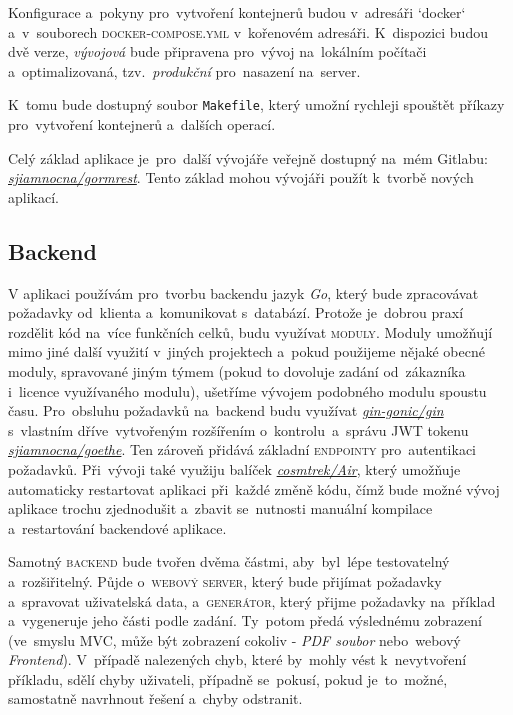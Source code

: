 \documentclass[14pt,a4paper]{article}
\begin{document}
        Konfigurace a~pokyny pro~vytvoření kontejnerů budou v~adresáři `docker` a~v~souborech \textsc{docker-compose.yml} v~kořenovém adresáři. K~dispozici budou dvě verze, \emph{vývojová} bude připravena pro~vývoj na~lokálním počítači a~optimalizovaná, tzv.~\emph{produkční} pro~nasazení na~server.

        K~tomu bude dostupný soubor \texttt{Makefile}, který umožní rychleji spouštět příkazy pro~vytvoření kontejnerů a~dalších operací.

        Celý základ aplikace je~pro~další vývojáře veřejně dostupný na~mém Gitlabu: \href{https://gitlab.com/sjiamnocna/gormrest}{\emph{sjiamnocna/gormrest}}. Tento základ mohou vývojáři použít k~tvorbě nových aplikací.
        
        \subsection{Backend}
            V aplikaci používám pro~tvorbu backendu jazyk \emph{Go}, který bude zpracovávat požadavky od~klienta a~komunikovat s~databází.
            Protože je~dobrou praxí rozdělit kód na~více funkčních celků, budu využívat \textsc{moduly}. Moduly umožňují mimo jiné další využití v~jiných projektech a~pokud použijeme nějaké obecné moduly, spravované jiným týmem (pokud to dovoluje zadání od~zákazníka i~licence využívaného modulu), ušetříme vývojem podobného modulu spoustu času. \cite{Zimmerman2023:howtowritebetter}
            Pro~obsluhu požadavků na~backend budu využívat \href{https://github.com/gin-gonic/gin}{\emph{gin-gonic/gin}} s~vlastním dříve~vytvořeným rozšířením o~kontrolu~a~správu \textsc{JWT} tokenu \href{https://gitlab.com/sjiamnocna/goethe}{\emph{sjiamnocna/goethe}}. Ten zároveň přidává základní \textsc{endpointy} pro~autentikaci požadavků.
            Při~vývoji také využiju balíček \href{https://github.com/cosmtrek/air}{\emph{cosmtrek/Air}}, který umožňuje automaticky restartovat aplikaci při~každé změně kódu, čímž bude možné vývoj aplikace trochu zjednodušit a~zbavit se~nutnosti manuální kompilace a~restartování backendové aplikace.

            Samotný \textsc{backend} bude tvořen dvěma částmi, aby~byl~lépe testovatelný a~rozšiřitelný. Půjde o~\textsc{webový server}, který bude přijímat požadavky a~spravovat uživatelská data, a~\textsc{generátor}, který přijme požadavky na~příklad a~vygeneruje jeho části podle zadání. Ty~potom předá výslednému zobrazení (ve~smyslu \textsc{MVC}, může být zobrazení cokoliv - \emph{PDF soubor} nebo~webový \emph{Frontend}). V~případě nalezených chyb, které by~mohly vést k~nevytvoření příkladu, sdělí chyby uživateli, případně se~pokusí, pokud je~to~možné, samostatně navrhnout řešení a~chyby odstranit.
            
\end{document}
